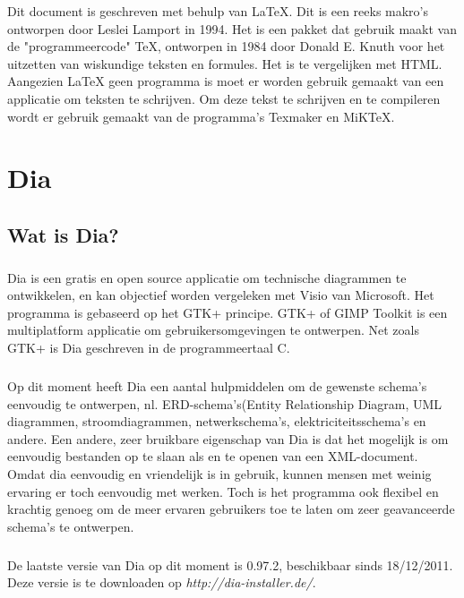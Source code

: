 \documentclass[12pt,a4paper]{report}
\begin{document}
\begin{flushleft}

Dit document is geschreven met behulp van \LaTeX{}. Dit is een reeks makro's ontworpen door Leslei Lamport in 1994. Het is een pakket dat gebruik maakt van de "programmeercode" \TeX{}, ontworpen in 1984 door Donald E. Knuth voor het uitzetten van wiskundige teksten en formules. Het is te vergelijken met HTML. Aangezien \LaTeX{} geen programma is moet er worden gebruik gemaakt van een applicatie om teksten te schrijven. Om deze tekst te schrijven en te compileren wordt er gebruik gemaakt van de programma's Texmaker en MiKTeX.

\tableofcontents

\chapter{Dia}
\section{Wat is Dia?}
\paragraph*{}
Dia is een gratis en open source applicatie om technische diagrammen te ontwikkelen, en kan objectief worden vergeleken met Visio van Microsoft. Het programma is gebaseerd op het GTK+ principe. GTK+ of GIMP Toolkit is een multiplatform applicatie om gebruikersomgevingen te ontwerpen. Net zoals GTK+ is Dia geschreven in de programmeertaal C. 
\paragraph*{}
Op dit moment heeft Dia een aantal hulpmiddelen om de gewenste schema's eenvoudig te ontwerpen, nl. ERD-schema's(Entity Relationship Diagram, UML diagrammen, stroomdiagrammen, netwerkschema's, elektriciteitsschema's en andere. Een andere, zeer bruikbare eigenschap van Dia is dat het mogelijk is om eenvoudig bestanden op te slaan als en te openen van een XML-document.
Omdat dia eenvoudig en vriendelijk is in gebruik, kunnen mensen met weinig ervaring er toch eenvoudig met werken. Toch is het programma ook flexibel en krachtig genoeg om de meer ervaren gebruikers toe te laten om zeer geavanceerde schema's te ontwerpen.
\paragraph*{}
De laatste versie van Dia op dit moment is 0.97.2, beschikbaar sinds 18/12/2011. Deze versie is te downloaden op \textit{http://dia-installer.de/}.
\pagebreak

\end{flushleft}
\end{document}
